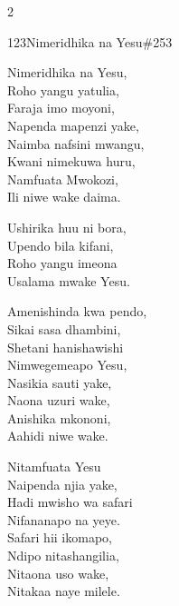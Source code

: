 \begin{multicols}{2}
\begin{hymn}{123}{Nimeridhika na Yesu}{\#253}
\begin{stanza}
Nimeridhika na Yesu,\\
Roho yangu yatulia,\\
Faraja imo moyoni,\\
Napenda mapenzi yake,\\
Naimba nafsini mwangu,\\
Kwani nimekuwa huru,\\
Namfuata Mwokozi,\\
Ili niwe wake daima.
\end{stanza}
\begin{chorus}
Ushirika huu ni bora,\\
Upendo bila kifani,\\
Roho yangu imeona\\
Usalama mwake Yesu.
\end{chorus}
\begin{stanza}
Amenishinda kwa pendo,\\
Sikai sasa dhambini,\\
Shetani hanishawishi\\
Nimwegemeapo Yesu,\\
Nasikia sauti yake,\\
Naona uzuri wake,\\
Anishika mkononi,\\
Aahidi niwe wake.
\end{stanza}
\begin{stanza}
Nitamfuata Yesu\\
Naipenda njia yake,\\
Hadi mwisho wa safari\\
Nifananapo na yeye.\\
Safari hii ikomapo,\\
Ndipo nitashangilia,\\
Nitaona uso wake,\\
Nitakaa naye milele.
\end{stanza}
\end{hymn}


\end{multicols}
